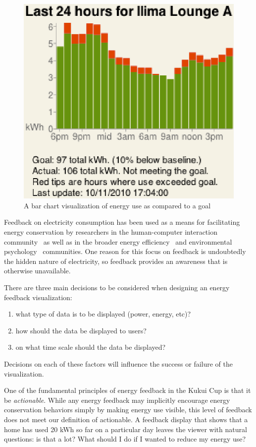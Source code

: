 \documentclass[10pt, conference, compsocconf]{IEEEtran-old}
\begin{document}
\begin{figure}[!tb]
	\centering
	\includegraphics[width=0.9\columnwidth]{energy-24hours-new.eps}
	\caption{A bar chart visualization of energy use as compared to a goal}
	\label{fig:energy-24hours}
\end{figure}

Feedback on electricity consumption has been used as a means for facilitating energy conservation by researchers in the human-computer interaction community~\cite{Froehlich2010} as well as in the broader energy efficiency~\cite{darby-review-2006, Faruqui09, Foster-2012} and environmental psychology~\cite{Becker78, Houwelingen89} communities. One reason for this focus on feedback is undoubtedly the hidden nature of electricity, so feedback provides an awareness that is otherwise unavailable.

There are three main decisions to be considered when designing an energy feedback visualization:
\begin{enumerate}
	\item what type of data is to be displayed (power, energy, etc)?
	\item how should the data be displayed to users?
	\item on what time scale should the data be displayed?
\end{enumerate}
Decisions on each of these factors will influence the success or failure of the visualization.

One of the fundamental principles of energy feedback in the Kukui Cup is that it be \emph{actionable}. While any energy feedback may implicitly encourage energy conservation behaviors simply by making energy use visible, this level of feedback does not meet our definition of actionable. A feedback display that shows that a home has used 20 kWh so far on a particular day leaves the viewer with natural questions: is that a lot? What should I do if I wanted to reduce my energy use?
\end{document}
